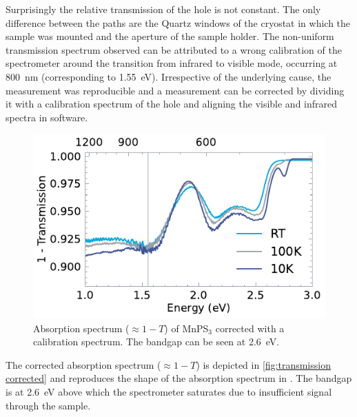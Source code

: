 \documentclass[
	twoside,
	parskip=half,
	a4paper,
]{scrbook}
\begin{document}
Surprisingly the relative transmission of the hole is not constant.
The only difference between the paths are the Quartz windows of the cryostat in which the sample was mounted and the aperture of the sample holder.
The non-uniform transmission spectrum observed can be attributed to a wrong calibration of the spectrometer around the transition from infrared to visible mode, occurring at \SI{800}{nm} (corresponding to \SI{1.55}{eV}).\clearpage
Irrespective of the underlying cause, the measurement was reproducible and a measurement can be corrected by dividing it with a calibration spectrum of the hole and aligning the visible and infrared spectra in software.
\begin{figure}
	\centering
	\includegraphics{../figures/2024-03-15 MnPS3 transmission processed.pdf }
	\caption{Absorption spectrum ($\approx 1- T$) of MnPS$_3$ corrected with a calibration spectrum. The bandgap can be seen at \SI{2.6}{eV}.}
	\label{fig:transmission corrected}
\end{figure}
The corrected absorption spectrum ($\approx 1 - T$) is depicted in \autoref{fig:transmission corrected} and reproduces the shape of the absorption spectrum in \cite{MnPS3_transmission}.
The bandgap is at \SI{2.6}{eV} above which the spectrometer saturates due to insufficient signal through the sample.
\end{document}
